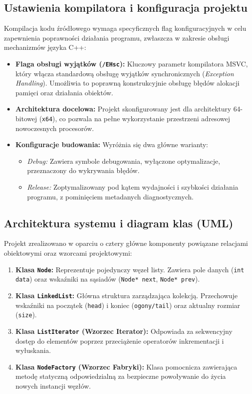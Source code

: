 \subsection{Ustawienia kompilatora i konfiguracja projektu}
Kompilacja kodu źródłowego wymaga specyficznych flag konfiguracyjnych w celu zapewnienia poprawności działania programu, zwłaszcza w zakresie obsługi mechanizmów języka C++:
\begin{itemize}
    \item \textbf{Flaga obsługi wyjątków (\texttt{/EHsc}):} Kluczowy parametr kompilatora MSVC, który włącza standardową obsługę wyjątków synchronicznych (\textit{Exception Handling}). Umożliwia to poprawną konstrukcyjnie obsługę błędów alokacji pamięci oraz działania obiektów.
    \item \textbf{Architektura docelowa:} Projekt skonfigurowany jest dla architektury 64-bitowej (\texttt{x64}), co pozwala na pełne wykorzystanie przestrzeni adresowej nowoczesnych procesorów.
    \item \textbf{Konfiguracje budowania:} Wyróżnia się dwa główne warianty:
    \begin{itemize}
        \item \textit{Debug:} Zawiera symbole debugowania, wyłączone optymalizacje, przeznaczony do wykrywania błędów.
        \item \textit{Release:} Zoptymalizowany pod kątem wydajności i szybkości działania programu, z pominięciem metadanych diagnostycznych.
    \end{itemize}
\end{itemize}

\subsection{Architektura systemu i diagram klas (UML)}
Projekt zrealizowano w oparciu o cztery główne komponenty powiązane relacjami obiektowymi oraz wzorcami projektowymi:
\begin{enumerate}
    \item \textbf{Klasa \texttt{Node}:} Reprezentuje pojedynczy węzeł listy. Zawiera pole danych (\texttt{int data}) oraz wskaźniki na sąsiadów (\texttt{Node* next}, \texttt{Node* prev}).
    \item \textbf{Klasa \texttt{LinkedList}:} Główna struktura zarządzająca kolekcją. Przechowuje wskaźniki na początek (\texttt{head}) i koniec (\texttt{ogony/tail}) oraz aktualny rozmiar (\texttt{size}).
    \item \textbf{Klasa \texttt{ListIterator} (Wzorzec Iterator):} Odpowiada za sekwencyjny dostęp do elementów poprzez przeciążenie operatorów inkrementacji i wyłuskania.
    \item \textbf{Klasa \texttt{NodeFactory} (Wzorzec Fabryki):} Klasa pomocnicza zawierająca metodę statyczną odpowiedzialną za bezpieczne powoływanie do życia nowych instancji węzłów.
\end{enumerate}

